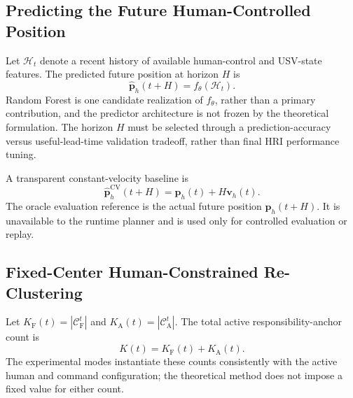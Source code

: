 \documentclass[letterpaper, 10pt, conference]{ieeeconf}
\begin{document}
\subsection{Predicting the Future Human-Controlled Position}

Let \(\mathcal{H}_t\) denote a recent history of available human-control and USV-state features. The predicted future position at horizon \(H\) is
\begin{equation}
  \hat{\mathbf{p}}_h(t+H) = f_\theta(\mathcal{H}_t).
  \label{eq:human_destination_prediction}
\end{equation}
Random Forest is one candidate realization of \(f_\theta\), rather than a primary contribution, and the predictor architecture is not frozen by the theoretical formulation. The horizon \(H\) must be selected through a prediction-accuracy versus useful-lead-time validation tradeoff, rather than final HRI performance tuning.

A transparent constant-velocity baseline is
\begin{equation}
  \hat{\mathbf{p}}_h^{\mathrm{CV}}(t+H) =
  \mathbf{p}_h(t) + H\mathbf{v}_h(t).
  \label{eq:constant_velocity_prediction}
\end{equation}
The oracle evaluation reference is the actual future position \(\mathbf{p}_h(t+H)\). It is unavailable to the runtime planner and is used only for controlled evaluation or replay.

\subsection{Fixed-Center Human-Constrained Re-Clustering}


Let \(K_{\mathrm{F}}(t)=|\mathcal{C}_{\mathrm{F}}^t|\) and \(K_{\mathrm{A}}(t)=|\mathcal{C}_{\mathrm{A}}^t|\). The total active responsibility-anchor count is
\begin{equation}
  K(t) = K_{\mathrm{F}}(t) + K_{\mathrm{A}}(t).
  \label{eq:responsibility_anchor_count}
\end{equation}
The experimental modes instantiate these counts consistently with the active human and command configuration; the theoretical method does not impose a fixed value for either count.
\end{document}
